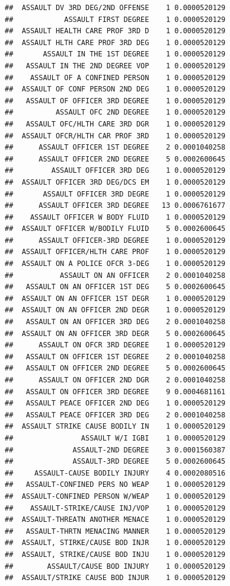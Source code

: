 \documentclass[]{book}
\begin{document}
\begin{verbatim}
##  ASSAULT DV 3RD DEG/2ND OFFENSE    1 0.0000520129
##            ASSAULT FIRST DEGREE    1 0.0000520129
##  ASSAULT HEALTH CARE PROF 3RD D    1 0.0000520129
##  ASSAULT HLTH CARE PROF 3RD DEG    1 0.0000520129
##       ASSAULT IN THE 1ST DEGREE    1 0.0000520129
##   ASSAULT IN THE 2ND DEGREE VOP    1 0.0000520129
##    ASSAULT OF A CONFINED PERSON    1 0.0000520129
##  ASSAULT OF CONF PERSON 2ND DEG    1 0.0000520129
##   ASSAULT OF OFFICER 3RD DEGREE    1 0.0000520129
##          ASSAULT OFC 2ND DEGREE    1 0.0000520129
##   ASSAULT OFC/HLTH CARE 3RD DGR    1 0.0000520129
##  ASSAULT OFCR/HLTH CAR PROF 3RD    1 0.0000520129
##      ASSAULT OFFICER 1ST DEGREE    2 0.0001040258
##      ASSAULT OFFICER 2ND DEGREE    5 0.0002600645
##         ASSAULT OFFICER 3RD DEG    1 0.0000520129
##  ASSAULT OFFICER 3RD DEG/DCS EM    1 0.0000520129
##       ASSAULT OFFICER 3RD DEGRE    1 0.0000520129
##      ASSAULT OFFICER 3RD DEGREE   13 0.0006761677
##    ASSAULT OFFICER W BODY FLUID    1 0.0000520129
##  ASSAULT OFFICER W/BODILY FLUID    5 0.0002600645
##      ASSAULT OFFICER-3RD DEGREE    1 0.0000520129
##  ASSAULT OFFICER/HLTH CARE PROF    1 0.0000520129
##  ASSAULT ON A POLICE OFCR 3-DEG    1 0.0000520129
##           ASSAULT ON AN OFFICER    2 0.0001040258
##   ASSAULT ON AN OFFICER 1ST DEG    5 0.0002600645
##  ASSAULT ON AN OFFICER 1ST DEGR    1 0.0000520129
##  ASSAULT ON AN OFFICER 2ND DEGR    1 0.0000520129
##   ASSAULT ON AN OFFICER 3RD DEG    2 0.0001040258
##  ASSAULT ON AN OFFICER 3RD DEGR    5 0.0002600645
##      ASSAULT ON OFCR 3RD DEGREE    1 0.0000520129
##   ASSAULT ON OFFICER 1ST DEGREE    2 0.0001040258
##   ASSAULT ON OFFICER 2ND DEGREE    5 0.0002600645
##      ASSAULT ON OFFICER 2ND DGR    2 0.0001040258
##   ASSAULT ON OFFICER 3RD DEGREE    9 0.0004681161
##   ASSAULT PEACE OFFICER 2ND DEG    1 0.0000520129
##   ASSAULT PEACE OFFICER 3RD DEG    2 0.0001040258
##  ASSAULT STRIKE CAUSE BODILY IN    1 0.0000520129
##                ASSAULT W/I IGBI    1 0.0000520129
##              ASSAULT-2ND DEGREE    3 0.0001560387
##              ASSAULT-3RD DEGREE    5 0.0002600645
##     ASSAULT-CAUSE BODILY INJURY    4 0.0002080516
##   ASSAULT-CONFINED PERS NO WEAP    1 0.0000520129
##  ASSAULT-CONFINED PERSON W/WEAP    1 0.0000520129
##    ASSAULT-STRIKE/CAUSE INJ/VOP    1 0.0000520129
##  ASSAULT-THREATN ANOTHER MENACE    1 0.0000520129
##   ASSAULT-THRTN MENACING MANNER    1 0.0000520129
##  ASSAULT, STIRKE/CAUSE BOD INJR    1 0.0000520129
##  ASSAULT, STRIKE/CAUSE BOD INJU    1 0.0000520129
##        ASSAULT/CAUSE BOD INJURY    1 0.0000520129
##  ASSAULT/STRIKE CAUSE BOD INJUR    1 0.0000520129

\end{verbatim}
\end{document}
